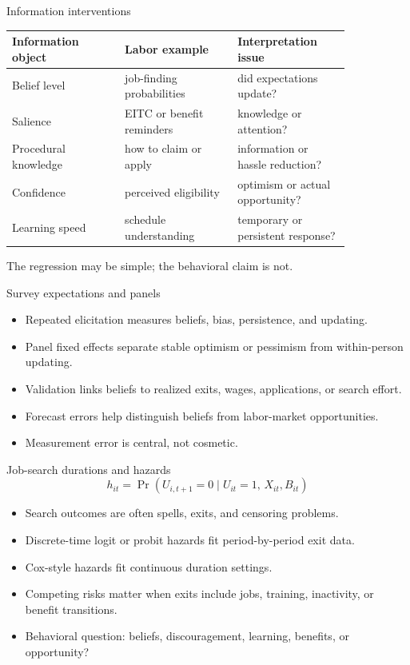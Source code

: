 \documentclass[aspectratio=169,11pt]{beamer}
\begin{document}
\begin{frame}{Information interventions}
\small
\begin{tabular}{p{0.28\linewidth} p{0.28\linewidth} p{0.28\linewidth}}
\toprule
Information object & Labor example & Interpretation issue \\
\midrule
Belief level & job-finding probabilities & did expectations update? \\
Salience & EITC or benefit reminders & knowledge or attention? \\
Procedural knowledge & how to claim or apply & information or hassle reduction? \\
Confidence & perceived eligibility & optimism or actual opportunity? \\
Learning speed & schedule understanding & temporary or persistent response? \\
\bottomrule
\end{tabular}

\vspace{0.7em}
The regression may be simple; the behavioral claim is not.
\end{frame}

\begin{frame}{Survey expectations and panels}
\begin{itemize}
    \item Repeated elicitation measures beliefs, bias, persistence, and updating.
    \item Panel fixed effects separate stable optimism or pessimism from within-person updating.
    \item Validation links beliefs to realized exits, wages, applications, or search effort.
    \item Forecast errors help distinguish beliefs from labor-market opportunities.
    \item Measurement error is central, not cosmetic.
\end{itemize}
\end{frame}

\begin{frame}{Job-search durations and hazards}
\[
h_{it} = \Pr(U_{i,t+1}=0 \mid U_{it}=1,\, X_{it}, B_{it})
\]

\begin{itemize}
    \item Search outcomes are often spells, exits, and censoring problems.
    \item Discrete-time logit or probit hazards fit period-by-period exit data.
    \item Cox-style hazards fit continuous duration settings.
    \item Competing risks matter when exits include jobs, training, inactivity, or benefit transitions.
    \item Behavioral question: beliefs, discouragement, learning, benefits, or opportunity?
\end{itemize}
\end{frame}
\end{document}
